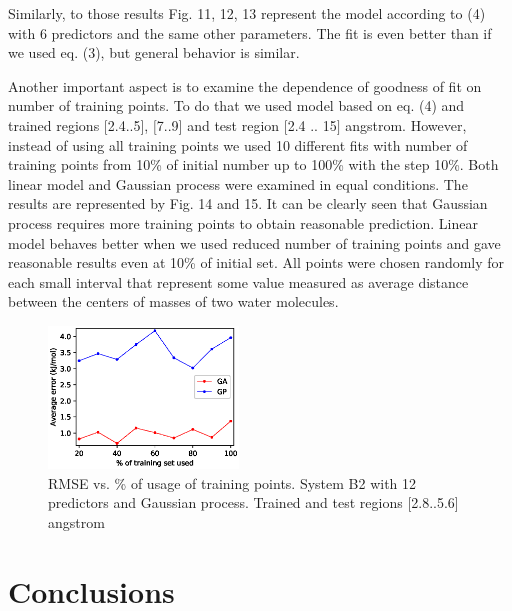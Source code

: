 \documentclass[aps,prl,reprint,amsmath,amssymb,nature]{revtex4-1}
\begin{document}
Similarly, to those results Fig. 11, 12, 13 represent the model 
according to (4) with 6 predictors and the same other parameters. The 
fit is even better than if we used eq. (3), but general behavior is 
similar.




Another important aspect is to examine the dependence of goodness of fit 
on number of training points. To do that we used model based on eq. (4) 
and trained regions $[$2.4..5$]$, $[$7..9$]$ and test region $[$2.4 .. 
15$]$ angstrom. However, instead of using all training points we used 10 
different fits with number of training points from 10\% of initial 
number up to 100\% with the step 10\%. Both linear model and Gaussian 
process were examined in equal conditions. The results are represented 
by Fig. 14 and 15. It can be clearly seen that Gaussian process requires 
more training points to obtain reasonable prediction. Linear model 
behaves better when we used reduced number of training points and gave 
reasonable results even at 10\% of initial set. All points were chosen 
randomly for each small interval that represent some value measured as 
average distance between the centers of masses of two water molecules. 

\begin{figure}[h]
\centering
\includegraphics[width=0.45\textwidth]{media/B2_12_predictors_RMSE_vs_percentage_of_training_set_used.eps}
\caption{RMSE vs. \% of usage of training points. System B2 with 12 predictors and Gaussian process. Trained and test regions [2.8..5.6] angstrom}
\label{Fig:B2_fractions}
\end{figure}

\section{Conclusions}
\end{document}
